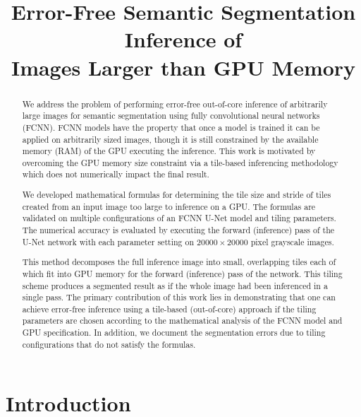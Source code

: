 \documentclass[letterpaper]{article} %
\title{Error-Free Semantic Segmentation Inference of \\
	Images Larger than GPU Memory}
\begin{document}
\maketitle
 
\begin{abstract}

We address the problem of performing error-free out-of-core inference of arbitrarily large images for semantic segmentation using fully convolutional neural networks (FCNN). FCNN models have the property that once a model is trained it can be applied on arbitrarily sized images, though it is still constrained by the available memory (RAM) of the GPU executing the inference. This work is motivated by overcoming the GPU memory size constraint via a tile-based inferencing methodology which does not numerically impact the final result.

We developed mathematical formulas for determining the tile size and stride of tiles created from an input image too large to inference on a GPU. The formulas are validated on multiple configurations of an FCNN U-Net model and tiling parameters. The numerical accuracy is evaluated by executing the forward (inference) pass of the U-Net network with each parameter setting on $\num{20000} \times \num{20000}$ pixel grayscale images. 

This method decomposes the full inference image into small, overlapping tiles each of which fit into GPU memory for the forward (inference) pass of the network. 
This tiling scheme produces a segmented result as if the whole image had been inferenced in a single pass. 
The primary contribution of this work lies in demonstrating that one can achieve error-free inference using a tile-based (out-of-core) approach if the tiling parameters are chosen according to the mathematical analysis of the FCNN model and GPU specification. 
In addition, we document the segmentation errors due to tiling configurations that do not satisfy the formulas. 

\end{abstract}

\section{Introduction}
\end{document}
